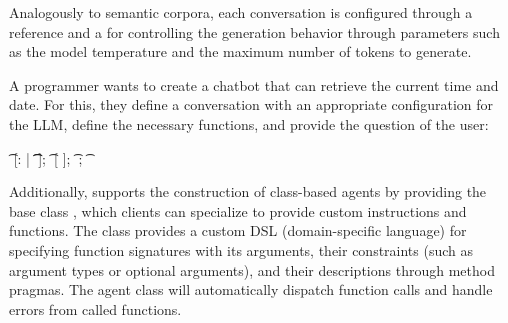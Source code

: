 Analogously to semantic corpora, each conversation is configured through a  reference and a  for controlling the generation behavior through parameters such as the model temperature and the maximum number of tokens to generate.

\begin{example}
	A programmer wants to create a chatbot that can retrieve the current time and date.
	For this, they define a conversation with an appropriate configuration for the LLM, define the necessary functions, and provide the question of the user:

	\begin{multicode}
		  \n
		\t	{} [: | \n
		\t	\t	{}  ]; \n
		\t	{}   [ ]; \n
		\t	{} ; \n
		\t	{} 
	\end{multicode}
\end{example}

Additionally, \semtex supports the construction of class-based agents by providing the base class , which clients can specialize to provide custom instructions and functions.
The  class provides a custom DSL (domain-specific language) for specifying function signatures with its arguments, their constraints (such as argument types or optional arguments), and their descriptions through method pragmas.
The agent class will automatically dispatch function calls and handle errors from called functions.

